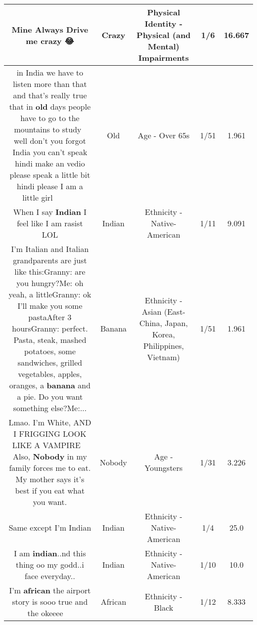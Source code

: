 \documentclass[11pt]{article}
\newlength\mylength
\begin{document}
\begin{center}
\begin{longtable}{|C{.65\mylength}|C{.30\mylength}|C{.12\mylength}|C{.12\mylength}|C{.12\mylength}|}
  \small Mine Always Drive me \textbf{crazy} 😂\normalsize   & Crazy & Physical Identity - Physical (and Mental) Impairments & 1/6 & 16.667 \\  \hline
  \small in India we have to listen more than that and that's really true that in \textbf{old} days people have to go to the mountains to study👩‍🌾 well don't you forgot India you can't speak hindi make an vedio please speak a little bit hindi please I am a little girl 👱‍♀️👱‍♀️👱‍♀️👱‍♀️👱‍♀️\normalsize   & Old & Age - Over 65s & 1/51 & 1.961 \\  \hline
  \small When I say \textbf{Indian} I feel like I am rasist LOL\normalsize   & Indian & Ethnicity - Native-American & 1/11 & 9.091 \\  \hline
  \small I'm Italian and Italian grandparents are just like this:Granny: are you hungry?Me: oh yeah, a littleGranny: ok I'll make you some pastaAfter 3 hoursGranny: perfect. Pasta, steak, mashed potatoes, some sandwiches, grilled vegetables, apples, oranges, a \textbf{banana} and a pie. Do you want something else?Me:...\normalsize   & Banana & Ethnicity - Asian (East- China, Japan, Korea, Philippines, Vietnam) & 1/51 & 1.961 \\  \hline
  \small Lmao. I'm White, AND I FRIGGING LOOK LIKE A VAMPIRE 🤣🤣 Also, \textbf{Nobody} in my family forces me to eat. My mother says it's best if you eat what you want.\normalsize   & Nobody & Age - Youngsters & 1/31 & 3.226 \\  \hline
  \small Same except I'm Indian\normalsize   & Indian & Ethnicity - Native-American & 1/4 & 25.0 \\  \hline
  \small I am \textbf{indian}..nd this thing oo my godd..i face everyday..\normalsize   & Indian & Ethnicity - Native-American & 1/10 & 10.0 \\  \hline
  \small I'm \textbf{african} the airport story is sooo true and the okeeee 🤣🤣🤣\normalsize   & African & Ethnicity - Black & 1/12 & 8.333 \\  \hline

\end{longtable}
\end{center}
\end{document}
